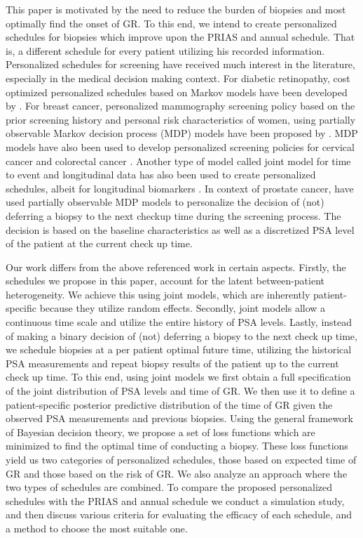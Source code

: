 This paper is motivated by the need to reduce the burden of biopsies and most optimally find the onset of GR. To this end, we intend to create personalized schedules for biopsies which improve upon the PRIAS and annual schedule. That is, a different schedule for every patient utilizing his recorded information. Personalized schedules for screening have received much interest in the literature, especially in the medical decision making context. For diabetic retinopathy, cost optimized personalized schedules based on Markov models have been developed by \citet{bebu2017OptimalScreening}. For breast cancer, personalized mammography screening policy based on the prior screening history and personal risk characteristics of women, using partially observable Markov decision process (MDP) models have been proposed by \citet*{ayer2012or}. MDP models have also been used to develop personalized screening policies for cervical cancer \citep*{akhavan2017markov} and colorectal cancer \citep*{erenay2014optimizing}. Another type of model called joint model for time to event and longitudinal data \citep{tsiatis2004joint,rizopoulos2012joint} has also been used to create personalized schedules, albeit for longitudinal biomarkers \citep{drizopoulosPersScreening}. In context of prostate cancer, \citet{zhang2012optimization} have used partially observable MDP models to personalize the decision of (not) deferring a biopsy to the next checkup time during the screening process. The decision is based on the baseline characteristics as well as a discretized PSA level of the patient at the current check up time.

Our work differs from the above referenced work in certain aspects. Firstly, the schedules we propose in this paper, account for the latent between-patient heterogeneity. We achieve this using joint models, which are inherently patient-specific because they utilize random effects. Secondly, joint models allow a continuous time scale and utilize the entire history of PSA levels. Lastly, instead of making a binary decision of (not) deferring a biopsy to the next check up time, we schedule biopsies at a per patient optimal future time, utilizing the historical PSA measurements and repeat biopsy results of the patient up to the current check up time. To this end, using joint models we first obtain a full specification of the joint distribution of PSA levels and time of GR. We then use it to define a patient-specific posterior predictive distribution of the time of GR given the observed PSA measurements and previous biopsies. Using the general framework of Bayesian decision theory, we propose a set of loss functions which are minimized to find the optimal time of conducting a biopsy. These loss functions yield us two categories of personalized schedules, those based on expected time of GR and those based on the risk of GR. We also analyze an approach where the two types of schedules are combined. To compare the proposed personalized schedules with the PRIAS and annual schedule we conduct a simulation study, and then discuss various criteria for evaluating the efficacy of each schedule, and a method to choose the most suitable one.

